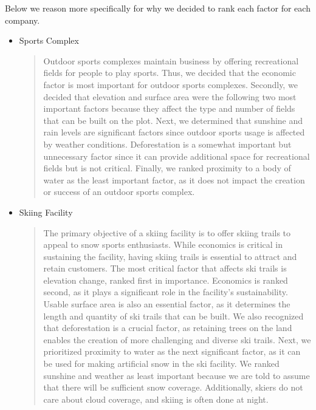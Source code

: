 \documentclass{mcmthesis}
\begin{document}
Below we reason more specifically for why we decided to rank each factor for each company.
\begin{itemize}
    \item Sports Complex
    \begin{quote}
        Outdoor sports complexes maintain business by offering recreational fields for people to play sports. Thus, we decided that the economic factor is most important for outdoor sports complexes. Secondly, we decided that elevation and surface area were the following two most important factors because they affect the type and number of fields that can be built on the plot. Next, we determined that sunshine and rain levels are significant factors since outdoor sports usage is affected by weather conditions. Deforestation is a somewhat important but unnecessary factor since it can provide additional space for recreational fields but is not critical. Finally, we ranked proximity to a body of water as the least important factor, as it does not impact the creation or success of an outdoor sports complex.
    \end{quote}

    \item Skiing Facility
    \begin{quote}
        The primary objective of a skiing facility is to offer skiing trails to appeal to snow sports enthusiasts. While economics is critical in sustaining the facility, having skiing trails is essential to attract and retain customers. The most critical factor that affects ski trails is elevation change, ranked first in importance. Economics is ranked second, as it plays a significant role in the facility's sustainability. Usable surface area is also an essential factor, as it determines the length and quantity of ski trails that can be built. We also recognized that deforestation is a crucial factor, as retaining trees on the land enables the creation of more challenging and diverse ski trails. Next, we prioritized proximity to water as the next significant factor, as it can be used for making artificial snow in the ski facility. We ranked sunshine and weather as least important because we are told to assume that there will be sufficient snow coverage. Additionally, skiers do not care about cloud coverage, and skiing is often done at night. 
    \end{quote}


\end{itemize}
\end{document}
